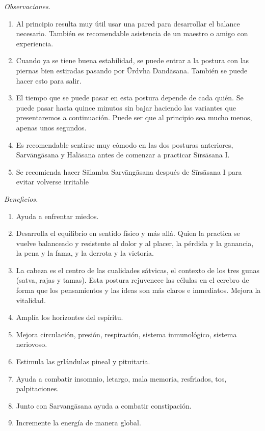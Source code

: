 \emph{Observaciones.}
\begin{enumerate}
\item Al principio resulta muy útil usar una
pared para desarrollar el balance necesario.
También es recomendable asistencia de un
maestro o amigo con experiencia.
\item Cuando ya se tiene buena estabilidad,
se puede entrar a la postura con las piernas
bien estiradas pasando por Ūrdvha Dandāsana.
También se puede hacer esto para salir.
\item El tiempo que se puede pasar en esta
postura depende de cada quién. Se puede pasar
hasta quince minutos sin bajar haciendo las
variantes que presentaremos a continuación.
Puede ser que al principio sea mucho menos,
apenas unos segundos.
\item Es recomendable sentirse muy cómodo en
las dos posturas anteriores, Sarvāngāsana y
Halāsana antes de comenzar a practicar
Sīrsāsana I.
\item Se recomienda hacer Sālamba
Sarvāngāsana después de Sīrsāsana I para
evitar volverse irritable
\end{enumerate}

\emph{Beneficios.}
\begin{enumerate}
\item Ayuda a enfrentar miedos.
\item Desarrolla el equilibrio en sentido
físico y más allá. Quien la practica se
vuelve balanceado y resistente al dolor y al
placer, la pérdida y la ganancia, la pena y
la fama, y la derrota y la victoria.
\item La cabeza es el centro de las
cualidades sátvicas, el contexto de los tres
gunas (satva, rajas y tamas). Esta postura
rejuvenece las células en el cerebro de forma
que los pensamientos y las ideas son más
claros e inmediatos. Mejora la vitalidad.
\item Amplía los horizontes del espíritu.
\item Mejora circulación, presión,
respiración, sistema inmunológico, sistema
neriovoso.
\item Estimula las grlándulas pineal y
pituitaria.
\item Ayuda a combatir insomnio, letargo,
mala memoria, resfriados, tos, palpitaciones.
\item Junto con Sarvangāsana ayuda a combatir
constipación.
\item Incremente la energía de manera global.
\end{enumerate}

